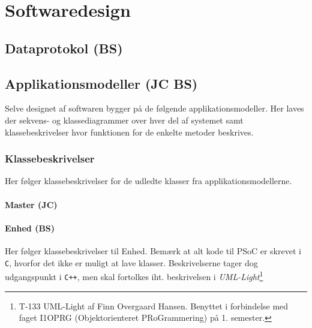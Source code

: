 \chapter{Softwaredesign}

\section{Dataprotokol (BS)}\label{header:dataprotokol}


\section{Applikationsmodeller (JC BS)}
Selve designet af softwaren bygger på de følgende applikationsmodeller. Her laves der sekvens- og klassediagrammer over hver del af systemet samt klassebeskrivelser hvor funktionen for de enkelte metoder beskrives.



\subsection{Klassebeskrivelser}
Her følger klassebeskrivelser for de udledte klasser fra applikationsmodellerne.

\subsubsection{Master (JC)}





\subsubsection{Enhed (BS)}
Her følger klassebeskrivelser til Enhed. 
Bemærk at alt kode til PSoC er skrevet i \verb+C+, hvorfor det ikke er muligt at lave klasser. Beskrivelserne tager dog udgangspunkt i \verb-C++-, men skal fortolkes iht. beskrivelsen i \textit{UML-Light}\footnote{T-133 UML-Light af Finn Overgaard Hansen. Benyttet i forbindelse med faget I1OPRG (Objektorienteret PRoGrammering) på 1. semester.} 




